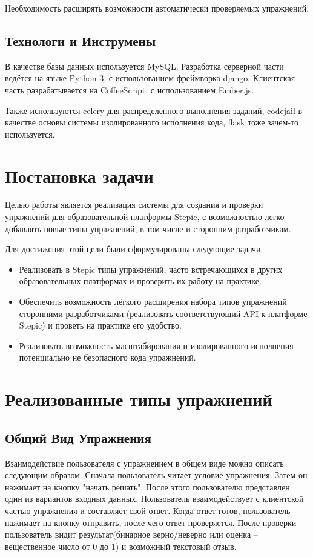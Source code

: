 \documentclass{matmex-diploma-custom}
\begin{document}
Необходимость расширять возможности автоматически проверяемых упражнений.

\subsection*{Технологи и Инструмены}
В качестве базы данных используется MySQL. Разработка серверной части
ведётся на языке Python 3, с использованием фреймворка
django. Клиентская часть разрабатывается на CoffeeScript, с
использованием Ember.js.

Также используются celery для распределённого выполнения заданий,
codejail в качестве основы системы изолированного исполнения кода,
flask тоже зачем-то используется.

\section{Постановка задачи}
Целью работы является реализация системы для создания и проверки
упражнений для образовательной платформы Stepic, с возможностью легко
добавлять новые типы упражнений, в том числе и сторонним
разработчикам.

Для достижения этой цели были сформулированы следующие задачи.

\begin{itemize}
\item Реализовать в Stepic типы упражнений, часто встречающихся в
  других образовательных платформах и проверить их работу на практике.
\item Обеспечить возможность лёгкого расширения набора типов
  упражнений сторонними разработчиками (реализовать соответствующий API
  к платформе Stepic) и проветь на практике его удобство.
\item Реализовать возможность масштабирования и изолированного
  исполнения потенциально не безопасного кода упражнений.
\end{itemize}

\section{Реализованные типы упражнений}

\subsection*{Общий Вид Упражнения}
Взаимодействие пользователя с упражнением в общем виде можно
описать следующим образом.  Сначала пользователь читает условие
упражнения. Затем он нажимает на кнопку "начать решать". После
этого пользователю представлен один из вариантов
входных данных. Пользователь взаимодействует с клиентской частью
упражнения и составляет свой ответ. Когда ответ готов, пользователь
нажимает на кнопку отправить, после чего ответ проверяется. После
проверки пользователь видит результат(бинарное верно/неверно или
оценка -- вещественное число от 0 до 1) и возможный текстовый отзыв.
\end{document}
